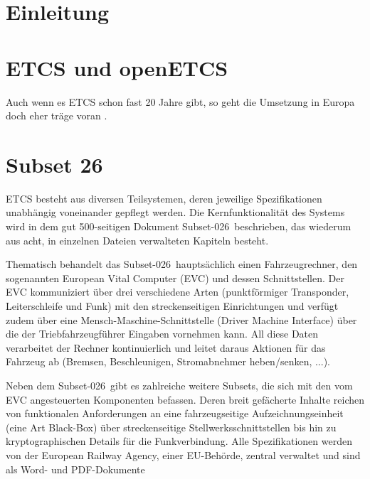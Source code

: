 \documentclass[twoside]{article}
\begin{document}
\begin{multicols}{2}
\noindent 

\section{Einleitung}

\lipsum[2]

\section{ETCS und openETCS}

Auch wenn es ETCS schon fast 20 Jahre gibt, so geht die Umsetzung in Europa doch eher träge voran \cite{traege_umsetzung}.

\section{Subset 26}

ETCS besteht aus diversen Teilsystemen, deren jeweilige Spezifikationen unabhängig voneinander gepflegt werden. Die Kernfunktionalität des Systems wird in dem gut 500-seitigen Dokument \glqq Subset-026\grqq\ beschrieben, das wiederum aus acht, in einzelnen Dateien verwalteten Kapiteln besteht.

Thematisch behandelt das \glqq Subset-026\grqq\ hauptsächlich einen Fahrzeugrechner, den sogenannten European Vital Computer (EVC) und dessen Schnittstellen. Der EVC kommuniziert über drei verschiedene Arten (punktförmiger Transponder, Leiterschleife und Funk) mit den streckenseitigen Einrichtungen und verfügt zudem über eine Mensch-Maschine-Schnittstelle (Driver Machine Interface) über die der Triebfahrzeugführer Eingaben vornehmen kann. All diese Daten verarbeitet der Rechner kontinuierlich und leitet daraus Aktionen für das Fahrzeug ab (Bremsen, Beschleunigen, Stromabnehmer heben/senken, ...).

Neben dem \glqq Subset-026\grqq\ gibt es zahlreiche weitere Subsets, die sich mit den vom EVC angesteuerten Komponenten befassen. Deren breit gefächerte Inhalte reichen von funktionalen Anforderungen an eine fahrzeugseitige Aufzeichnungseinheit (eine Art \glqq Black-Box\grqq ) über streckenseitige Stellwerksschnittstellen bis hin zu kryptographischen Details für die Funkverbindung. Alle Spezifikationen werden von der European Railway Agency, einer EU-Behörde, zentral verwaltet und sind als Word- und PDF-Dokumente 


\end{multicols}
\end{document}
